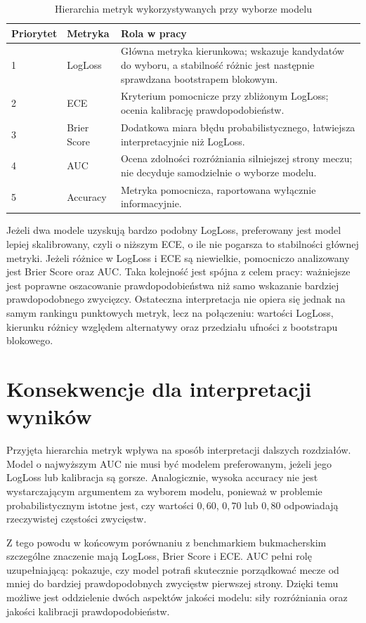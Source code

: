 \begin{table}[H]
    \centering
    \caption{Hierarchia metryk wykorzystywanych przy wyborze modelu}
    \label{tab:metric_hierarchy}
    \begin{tabular}{p{}p{}p{}}
        \toprule
        Priorytet & Metryka & Rola w pracy \\
        \midrule
        1 & LogLoss & Główna metryka kierunkowa; wskazuje kandydatów do wyboru, a stabilność różnic jest następnie sprawdzana bootstrapem blokowym. \\
        2 & ECE & Kryterium pomocnicze przy zbliżonym LogLoss; ocenia kalibrację prawdopodobieństw. \\
        3 & Brier Score & Dodatkowa miara błędu probabilistycznego, łatwiejsza interpretacyjnie niż LogLoss. \\
        4 & AUC & Ocena zdolności rozróżniania silniejszej strony meczu; nie decyduje samodzielnie o wyborze modelu. \\
        5 & Accuracy & Metryka pomocnicza, raportowana wyłącznie informacyjnie. \\
        \bottomrule
    \end{tabular}
\end{table}

Jeżeli dwa modele uzyskują bardzo podobny LogLoss, preferowany jest model lepiej skalibrowany, czyli
o niższym ECE, o ile nie pogarsza to stabilności głównej metryki. Jeżeli różnice w LogLoss i ECE są
niewielkie, pomocniczo analizowany jest Brier Score oraz AUC. Taka kolejność jest spójna z celem
pracy: ważniejsze jest poprawne oszacowanie prawdopodobieństwa niż samo wskazanie bardziej
prawdopodobnego zwycięzcy. Ostateczna interpretacja nie opiera się jednak na samym rankingu
punktowych metryk, lecz na połączeniu: wartości LogLoss, kierunku różnicy względem alternatywy oraz
przedziału ufności z bootstrapu blokowego.

\section{Konsekwencje dla interpretacji wyników}

Przyjęta hierarchia metryk wpływa na sposób interpretacji dalszych rozdziałów. Model o najwyższym
AUC nie musi być modelem preferowanym, jeżeli jego LogLoss lub kalibracja są gorsze. Analogicznie,
wysoka accuracy nie jest wystarczającym argumentem za wyborem modelu, ponieważ w problemie
probabilistycznym istotne jest, czy wartości \(0{,}60\), \(0{,}70\) lub \(0{,}80\) odpowiadają
rzeczywistej częstości zwycięstw.

Z tego powodu w końcowym porównaniu z benchmarkiem bukmacherskim szczególne znaczenie mają LogLoss,
Brier Score i ECE. AUC pełni rolę uzupełniającą: pokazuje, czy model potrafi skutecznie porządkować
mecze od mniej do bardziej prawdopodobnych zwycięstw pierwszej strony. Dzięki temu możliwe jest
oddzielenie dwóch aspektów jakości modelu: siły rozróżniania oraz jakości kalibracji
prawdopodobieństw.
